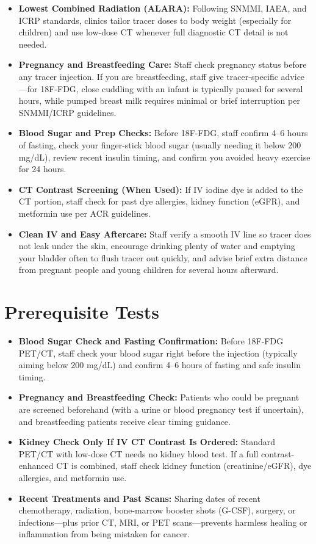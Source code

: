 \begin{itemize}
    \item \textbf{Lowest Combined Radiation (ALARA):} Following SNMMI, IAEA, and ICRP standards, clinics tailor tracer doses to body weight (especially for children) and use low-dose CT whenever full diagnostic CT detail is not needed.
    \item \textbf{Pregnancy and Breastfeeding Care:} Staff check pregnancy status before any tracer injection. If you are breastfeeding, staff give tracer-specific advice---for 18F-FDG, close cuddling with an infant is typically paused for several hours, while pumped breast milk requires minimal or brief interruption per SNMMI/ICRP guidelines.
    \item \textbf{Blood Sugar and Prep Checks:} Before 18F-FDG, staff confirm 4--6 hours of fasting, check your finger-stick blood sugar (usually needing it below 200 mg/dL), review recent insulin timing, and confirm you avoided heavy exercise for 24 hours.
    \item \textbf{CT Contrast Screening (When Used):} If IV iodine dye is added to the CT portion, staff check for past dye allergies, kidney function (eGFR), and metformin use per ACR guidelines.
    \item \textbf{Clean IV and Easy Aftercare:} Staff verify a smooth IV line so tracer does not leak under the skin, encourage drinking plenty of water and emptying your bladder often to flush tracer out quickly, and advise brief extra distance from pregnant people and young children for several hours afterward.
\end{itemize}

\section{Prerequisite Tests}

\begin{itemize}
    \item \textbf{Blood Sugar Check and Fasting Confirmation:} Before 18F-FDG PET/CT, staff check your blood sugar right before the injection (typically aiming below 200 mg/dL) and confirm 4--6 hours of fasting and safe insulin timing.
    \item \textbf{Pregnancy and Breastfeeding Check:} Patients who could be pregnant are screened beforehand (with a urine or blood pregnancy test if uncertain), and breastfeeding patients receive clear timing guidance.
    \item \textbf{Kidney Check Only If IV CT Contrast Is Ordered:} Standard PET/CT with low-dose CT needs no kidney blood test. If a full contrast-enhanced CT is combined, staff check kidney function (creatinine/eGFR), dye allergies, and metformin use.
    \item \textbf{Recent Treatments and Past Scans:} Sharing dates of recent chemotherapy, radiation, bone-marrow booster shots (G-CSF), surgery, or infections---plus prior CT, MRI, or PET scans---prevents harmless healing or inflammation from being mistaken for cancer.
\end{itemize}

